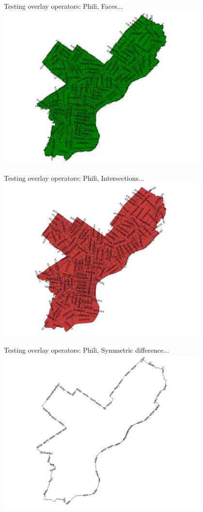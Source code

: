 \documentclass{beamer}
\begin{document}
\begin{frame}{Testing overlay operators: Phili, Faces...}
    \centering
	\includegraphics[trim=1cm 0 1cm 0, clip, width=0.8\textwidth]{figures/Phili_Faces}
\end{frame}
\begin{frame}{Testing overlay operators: Phili, Intersections...}
    \centering
	\includegraphics[trim=1cm 0 1cm 0, clip, width=0.8\textwidth]{figures/Phili_Intersections}
\end{frame}
\begin{frame}{Testing overlay operators: Phili, Symmetric difference...}
    \centering
	\includegraphics[trim=1cm 0 1cm 0, clip, width=0.8\textwidth]{figures/Phili_Symmetric}
\end{frame}
\end{document}
